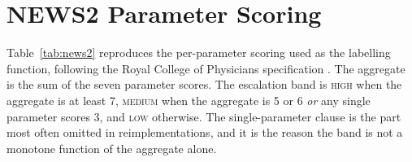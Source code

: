 \documentclass[lettersize,journal]{IEEEtran}
\begin{document}
\appendices

\section{NEWS2 Parameter Scoring}
\label{app:news2}

Table~\ref{tab:news2} reproduces the per-parameter scoring used as the labelling
function, following the Royal College of Physicians specification
\cite{rcp2017}. The aggregate is the sum of the seven parameter scores. The
escalation band is \textsc{high} when the aggregate is at least 7,
\textsc{medium} when the aggregate is 5 or 6 \emph{or} any single parameter
scores 3, and \textsc{low} otherwise. The single-parameter clause is the part
most often omitted in reimplementations, and it is the reason the band is not a
monotone function of the aggregate alone.
\end{document}
